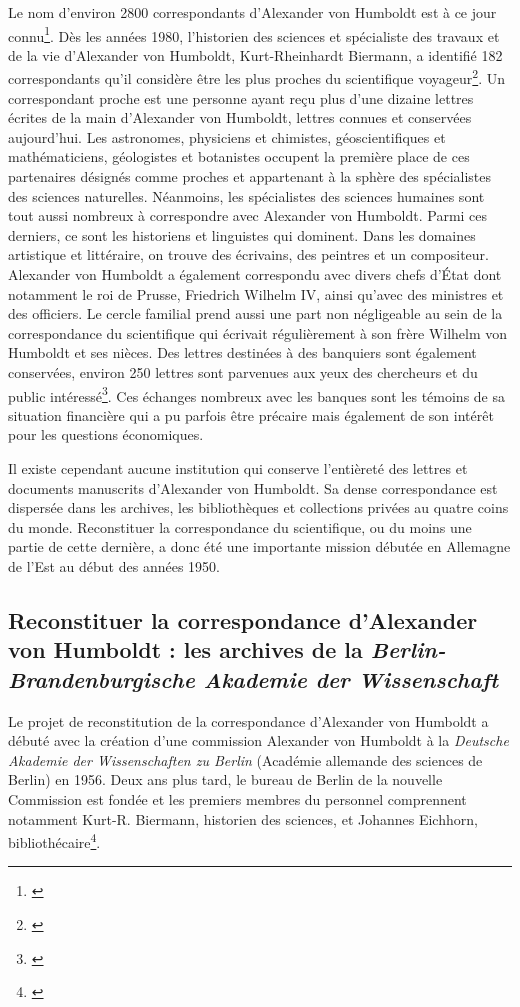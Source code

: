 \documentclass[a4paper, 12pt, twoside]{book}
\begin{document}
Le nom d'environ 2800 correspondants d'Alexander von Humboldt est à ce jour connu\footnote{\cite{schwarz_korrespondenz_2018}}. Dès les années 1980, l'historien des sciences et spécialiste des travaux et de la vie d'Alexander von Humboldt, Kurt-Rheinhardt Biermann, a identifié 182 correspondants qu'il considère être les plus proches du scientifique voyageur\footnote{\cite{schwarz_korrespondenz_2018}}. Un correspondant proche est une personne ayant reçu plus d'une dizaine lettres écrites de la main d'Alexander von Humboldt, lettres connues et conservées aujourd'hui. Les astronomes, physiciens et chimistes, géoscientifiques et mathématiciens, géologistes et botanistes occupent la première place de ces partenaires désignés comme proches et appartenant à la sphère des spécialistes des sciences naturelles. Néanmoins, les spécialistes des sciences humaines sont tout aussi nombreux à correspondre avec Alexander von Humboldt. Parmi ces derniers, ce sont les historiens et linguistes qui dominent. Dans les domaines artistique et littéraire, on trouve des écrivains, des peintres et un compositeur. Alexander von Humboldt a également correspondu avec divers chefs d'État dont notamment le roi de Prusse, Friedrich Wilhelm IV, ainsi qu'avec des ministres et des officiers. Le cercle familial prend aussi une part non négligeable au sein de la correspondance du scientifique qui écrivait régulièrement à son frère Wilhelm von Humboldt et ses nièces. Des lettres destinées à des banquiers sont également conservées, environ 250 lettres sont parvenues aux yeux des chercheurs et du public intéressé\footnote{\cite{schwarz_korrespondenz_2018}}. Ces échanges nombreux avec les banques sont les témoins de sa situation financière qui a pu parfois être précaire mais également de son intérêt pour les questions économiques.

Il existe cependant aucune institution qui conserve l'entièreté des lettres et documents manuscrits d'Alexander von Humboldt. Sa dense correspondance est dispersée dans les archives, les bibliothèques et collections privées au quatre coins du monde. Reconstituer la correspondance du scientifique, ou du moins une partie de cette dernière, a donc été une importante mission débutée en Allemagne de l'Est au début des années 1950. 

\subsection{Reconstituer la correspondance d'Alexander von Humboldt : les archives de la \textit{Berlin-Brandenburgische Akademie der Wissenschaft}}
Le projet de reconstitution de la correspondance d'Alexander von Humboldt a débuté avec la création d'une commission Alexander von Humboldt à la \textit{Deutsche Akademie der Wissenschaften zu Berlin} (Académie allemande des sciences de Berlin) en 1956. Deux ans plus tard, le bureau de Berlin de la nouvelle Commission est fondée et les premiers membres du personnel comprennent notamment Kurt-R. Biermann, historien des sciences, et Johannes Eichhorn, bibliothécaire\footnote{\cite[p.50]{schuchardt_fakt_2010}}.
\end{document}
